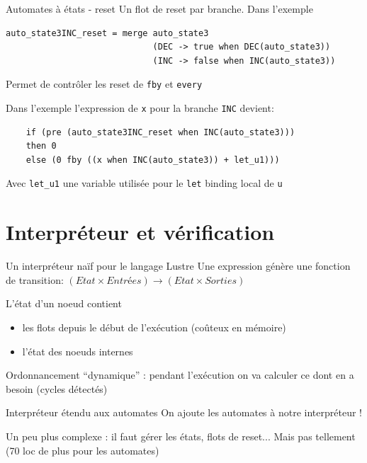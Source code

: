 \documentclass[xcolor={svgnames},aspectratio=169]{beamer}
\begin{document}
\begin{frame}[fragile]{Automates à états - reset}
  \lstset{basicstyle=\tt\scriptsize}
  Un flot de reset par branche.
  Dans l'exemple
  \begin{lstlisting}
auto_state3INC_reset = merge auto_state3
                             (DEC -> true when DEC(auto_state3))
                             (INC -> false when INC(auto_state3))
  \end{lstlisting}
  Permet de contrôler les reset de \lstinline{fby} et \lstinline{every}

  Dans l'exemple l'expression de \lstinline{x} pour la branche \lstinline{INC} devient:
  \begin{lstlisting}
    if (pre (auto_state3INC_reset when INC(auto_state3)))
    then 0
    else (0 fby ((x when INC(auto_state3)) + let_u1)))
  \end{lstlisting}
  Avec \lstinline{let_u1} une variable utilisée pour le \lstinline{let} binding local de \lstinline{u}
\end{frame}

\section{Interpréteur et vérification}

\begin{frame}{Un interpréteur naïf pour le langage Lustre}
  Une expression génère une fonction de transition:
  $(Etat \times Entrées) \rightarrow (Etat \times Sorties)$

  L'état d'un noeud contient
  \begin{itemize}
  \item les flots depuis le début de l'exécution (coûteux en mémoire)
  \item l'état des noeuds internes
  \end{itemize}

  Ordonnancement ``dynamique'' : pendant l'exécution on va calculer ce dont en a besoin (cycles détectés)
\end{frame}

\begin{frame}{Interpréteur étendu aux automates}
  On ajoute les automates à notre interpréteur !

  Un peu plus complexe : il faut gérer les états, flots de reset... Mais pas tellement (70 loc de plus pour les automates)
\end{frame}
\end{document}
